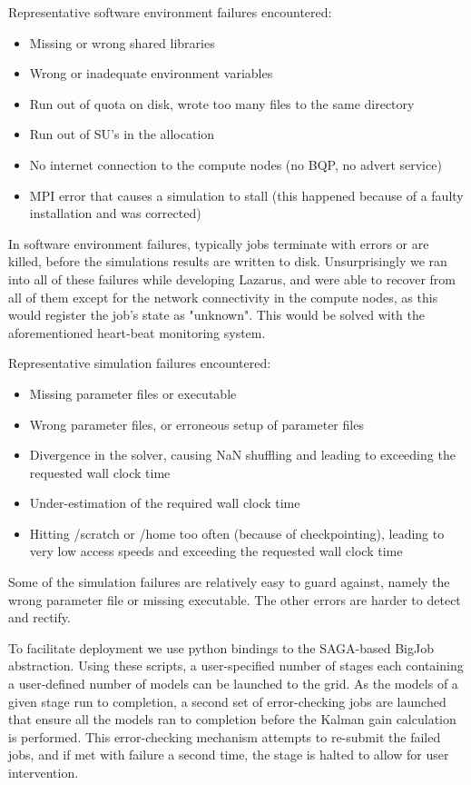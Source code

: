 \documentclass{sig-alternate}
\begin{document}
Representative software environment failures encountered:
\begin{itemize}
\item{Missing or wrong shared libraries}
\item{Wrong or inadequate environment variables}
\item{Run out of quota on disk, wrote too many files to the same directory}
\item{Run out of SU's in the allocation}
\item{No internet connection to the compute nodes (no BQP, no advert service)}
\item{MPI error that causes a simulation to stall (this happened because of a faulty installation and was corrected)}
\end{itemize}
In software environment failures, typically jobs terminate with errors
or are killed, before the simulations results are written to
disk. Unsurprisingly we ran into all of these failures while
developing Lazarus, and were able to recover from all of them except
for the network connectivity in the compute nodes, as this would
register the job's state as "unknown". This would be solved with the
aforementioned heart-beat monitoring system.

Representative simulation failures encountered:
\begin{itemize}
\item{Missing parameter files or executable}
\item{Wrong parameter files, or erroneous setup of parameter files}
\item{Divergence in the solver, causing NaN shuffling and leading to exceeding the requested wall clock time}
\item{Under-estimation of the required wall clock time}
\item{Hitting /scratch or /home too often (because of checkpointing), leading to very low access speeds and exceeding the requested wall clock time}
\end{itemize}
Some of the simulation failures are relatively easy to guard against,
namely the wrong parameter file or missing executable. The other
errors are harder to detect and rectify.

To facilitate deployment we use python bindings to the SAGA-based
BigJob abstraction. Using these scripts, a user-specified number of
stages each containing a user-defined number of models can be launched
to the grid. As the models of a given stage run to completion, a
second set of error-checking jobs are launched that ensure all the
models ran to completion before the Kalman gain calculation is
performed. This error-checking mechanism attempts to re-submit the
failed jobs, and if met with failure a second time, the stage is
halted to allow for user intervention.
\end{document}
